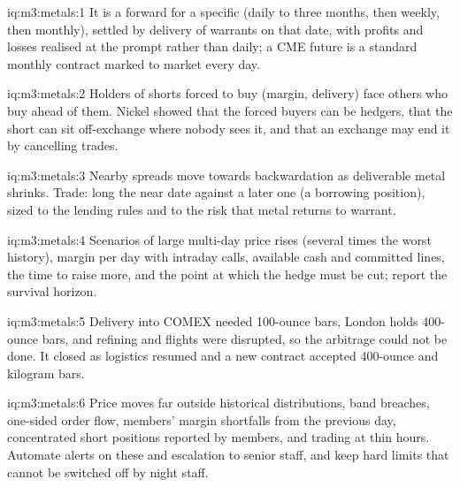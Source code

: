 \begin{solution}{iq:m3:metals:1}
It is a forward for a specific  (daily to three months, then weekly, then monthly), settled
by delivery of warrants on that date, with profits and losses realised at the prompt rather than
daily; a CME future is a standard monthly contract marked to market every day.
\end{solution}

\begin{solution}{iq:m3:metals:2}
Holders of shorts forced to buy (margin, delivery) face others who buy ahead of them. Nickel showed
that the forced buyers can be hedgers, that the short can sit off-exchange where nobody sees it, and
that an exchange may end it by cancelling trades.
\end{solution}

\begin{solution}{iq:m3:metals:3}
Nearby spreads move towards backwardation as deliverable metal shrinks. Trade: long the near date
against a later one (a borrowing position), sized to the lending rules and to the risk that metal
returns to warrant.
\end{solution}

\begin{solution}{iq:m3:metals:4}
Scenarios of large multi-day price rises (several times the worst history), margin per day with
intraday calls, available cash and committed lines, the time to raise more, and the point at which
the hedge must be cut; report the survival horizon.
\end{solution}

\begin{solution}{iq:m3:metals:5}
Delivery into COMEX needed 100-ounce bars, London holds 400-ounce bars, and refining and flights were
disrupted, so the arbitrage could not be done. It closed as logistics resumed and a new contract
accepted 400-ounce and kilogram bars.
\end{solution}

\begin{solution}{iq:m3:metals:6}
Price moves far outside historical distributions, band breaches, one-sided order flow, members'
margin shortfalls from the previous day, concentrated short positions reported by members, and
trading at thin hours. Automate alerts on these and escalation to senior staff, and keep hard limits
that cannot be switched off by night staff.
\end{solution}
